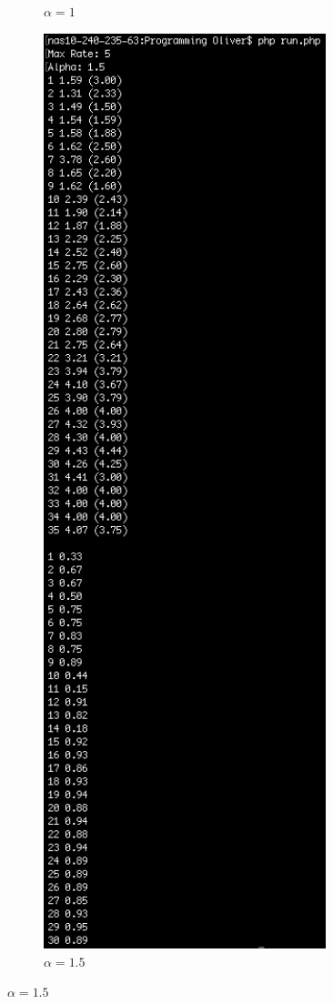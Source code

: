 \documentclass{article}
\begin{document}
\begin{figure}[htp]
\begin{subfigure}{0.45\textwidth}
\caption{$\alpha = 1$}
\label{fig:screen_alpha1}
\end{subfigure}%
\begin{subfigure}{0.45\textwidth}
\centering
\includegraphics[width=0.9\textwidth]{Screenshots/Alpha1_5}
\caption{$\alpha = 1.5$}
\label{fig:screen_alpha1.5}
\end{subfigure}
\end{figure}
\end{document}
